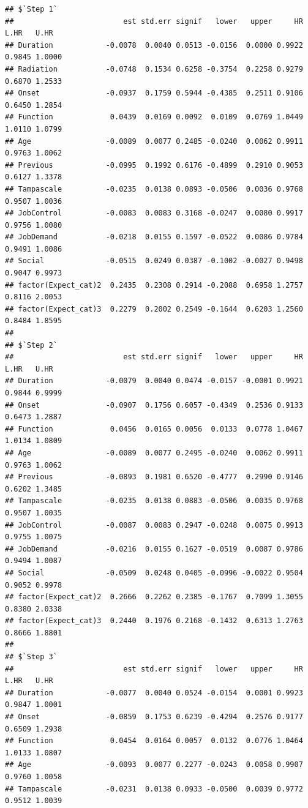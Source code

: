 \documentclass[
]{book}
\begin{document}
\begin{verbatim}
## $`Step 1`
##                         est std.err signif   lower   upper     HR   L.HR   U.HR
## Duration            -0.0078  0.0040 0.0513 -0.0156  0.0000 0.9922 0.9845 1.0000
## Radiation           -0.0748  0.1534 0.6258 -0.3754  0.2258 0.9279 0.6870 1.2533
## Onset               -0.0937  0.1759 0.5944 -0.4385  0.2511 0.9106 0.6450 1.2854
## Function             0.0439  0.0169 0.0092  0.0109  0.0769 1.0449 1.0110 1.0799
## Age                 -0.0089  0.0077 0.2485 -0.0240  0.0062 0.9911 0.9763 1.0062
## Previous            -0.0995  0.1992 0.6176 -0.4899  0.2910 0.9053 0.6127 1.3378
## Tampascale          -0.0235  0.0138 0.0893 -0.0506  0.0036 0.9768 0.9507 1.0036
## JobControl          -0.0083  0.0083 0.3168 -0.0247  0.0080 0.9917 0.9756 1.0080
## JobDemand           -0.0218  0.0155 0.1597 -0.0522  0.0086 0.9784 0.9491 1.0086
## Social              -0.0515  0.0249 0.0387 -0.1002 -0.0027 0.9498 0.9047 0.9973
## factor(Expect_cat)2  0.2435  0.2308 0.2914 -0.2088  0.6958 1.2757 0.8116 2.0053
## factor(Expect_cat)3  0.2279  0.2002 0.2549 -0.1644  0.6203 1.2560 0.8484 1.8595
## 
## $`Step 2`
##                         est std.err signif   lower   upper     HR   L.HR   U.HR
## Duration            -0.0079  0.0040 0.0474 -0.0157 -0.0001 0.9921 0.9844 0.9999
## Onset               -0.0907  0.1756 0.6057 -0.4349  0.2536 0.9133 0.6473 1.2887
## Function             0.0456  0.0165 0.0056  0.0133  0.0778 1.0467 1.0134 1.0809
## Age                 -0.0089  0.0077 0.2495 -0.0240  0.0062 0.9911 0.9763 1.0062
## Previous            -0.0893  0.1981 0.6520 -0.4777  0.2990 0.9146 0.6202 1.3485
## Tampascale          -0.0235  0.0138 0.0883 -0.0506  0.0035 0.9768 0.9507 1.0035
## JobControl          -0.0087  0.0083 0.2947 -0.0248  0.0075 0.9913 0.9755 1.0075
## JobDemand           -0.0216  0.0155 0.1627 -0.0519  0.0087 0.9786 0.9494 1.0087
## Social              -0.0509  0.0248 0.0405 -0.0996 -0.0022 0.9504 0.9052 0.9978
## factor(Expect_cat)2  0.2666  0.2262 0.2385 -0.1767  0.7099 1.3055 0.8380 2.0338
## factor(Expect_cat)3  0.2440  0.1976 0.2168 -0.1432  0.6313 1.2763 0.8666 1.8801
## 
## $`Step 3`
##                         est std.err signif   lower   upper     HR   L.HR   U.HR
## Duration            -0.0077  0.0040 0.0524 -0.0154  0.0001 0.9923 0.9847 1.0001
## Onset               -0.0859  0.1753 0.6239 -0.4294  0.2576 0.9177 0.6509 1.2938
## Function             0.0454  0.0164 0.0057  0.0132  0.0776 1.0464 1.0133 1.0807
## Age                 -0.0093  0.0077 0.2277 -0.0243  0.0058 0.9907 0.9760 1.0058
## Tampascale          -0.0231  0.0138 0.0933 -0.0500  0.0039 0.9772 0.9512 1.0039

\end{verbatim}
\end{document}
